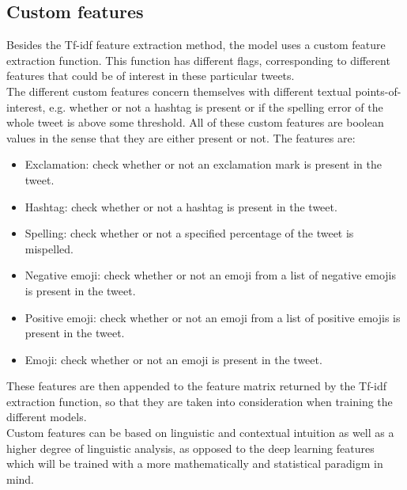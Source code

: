 \subsection{Custom features} \label{sec:customfeat}
Besides the Tf-idf feature extraction method, the model uses a custom feature extraction function. This function has different flags, corresponding to different features that could be of interest in these particular tweets. \\
The different custom features concern themselves with different textual points-of-interest, e.g. whether or not a hashtag is present or if the spelling error of the whole tweet is above some threshold. All of these custom features are boolean values in the sense that they are either present or not. The features are:\\
\begin{itemize}
\item Exclamation: check whether or not an exclamation mark is present in the tweet.
\item Hashtag: check whether or not a hashtag is present in the tweet.
\item Spelling: check whether or not a specified percentage of the tweet is mispelled.
\item Negative emoji: check whether or not an emoji from a list of negative emojis is present in the tweet.
\item Positive emoji: check whether or not an emoji from a list of positive emojis is present in the tweet.
\item Emoji: check whether or not an emoji is present in the tweet.
\end{itemize}
These features are then appended to the feature matrix returned by the Tf-idf extraction function, so that they are taken into consideration when training the different models. \\
Custom features can be based on linguistic and contextual intuition as well as a higher degree of linguistic analysis, as opposed to the deep learning features which will be trained with a more mathematically and statistical paradigm in mind.

